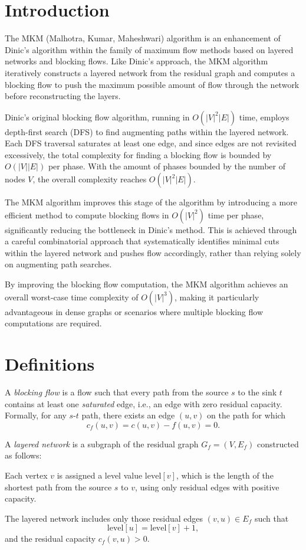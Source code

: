 \section{Introduction}
The MKM (Malhotra, Kumar, Maheshwari) \cite{MKM} algorithm is an enhancement of Dinic's algorithm within the family of maximum flow methods based on layered networks and blocking flows. Like Dinic's approach, the MKM algorithm iteratively constructs a layered network from the residual graph and computes a blocking flow to push the maximum possible amount of flow through the network before reconstructing the layers.

Dinic’s original blocking flow algorithm, running in $O(|V|^2|E|)$ time, employs depth-first search (DFS) to find augmenting paths within the layered network. Each DFS traversal saturates at least one edge, and since edges are not revisited excessively, the total complexity for finding a blocking flow is bounded by $O(|V||E|)$ per phase. With the amount of phases bounded by the number of nodes $V$, the overall complexity reaches $O(|V|^2 |E|)$.

The MKM algorithm improves this stage of the algorithm by introducing a more efficient method to compute blocking flows in $O(|V|^2)$ time per phase, significantly reducing the bottleneck in Dinic’s method. This is achieved through a careful combinatorial approach that systematically identifies minimal cuts within the layered network and pushes flow accordingly, rather than relying solely on augmenting path searches.

By improving the blocking flow computation, the MKM algorithm achieves an overall worst-case time complexity of $O(|V|^3)$, making it particularly advantageous in dense graphs or scenarios where multiple blocking flow computations are required.

\section{Definitions}

\begin{defn}
A \emph{blocking flow} is a flow such that every path from the source $s$ to the sink $t$ contains at least one \emph{saturated} edge, i.e., an edge with zero residual capacity. Formally, for any $s$-$t$ path, there exists an edge $ (u, v) $ on the path for which
$$
c_f(u, v) = c(u, v) - f(u, v) = 0.
$$
\end{defn}

\begin{defn}
A \emph{layered network} is a subgraph of the residual graph $G_f = (V,E_f)$ constructed as follows:

Each vertex $v$ is assigned a level value $ \text{level}[v] $, which is the length of the shortest path from the source $s$ to $v$, using only residual edges with positive capacity.

The layered network includes only those residual edges $ (v, u) \in E_f$ such that
$$
\text{level}[u] = \text{level}[v] + 1,
$$
and the residual capacity $ c_f(v, u) > 0 $.
\end{defn}

